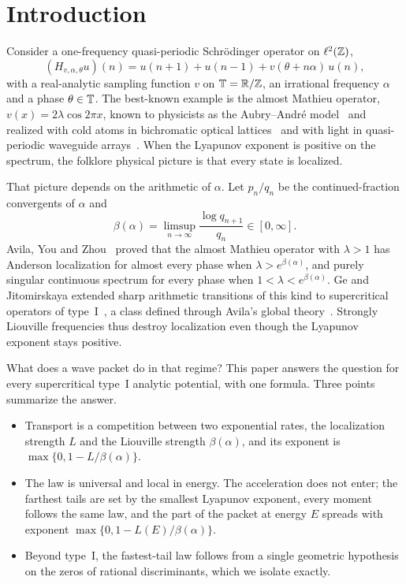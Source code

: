 \section{Introduction}\label{sec:intro}

Consider a one-frequency quasi-periodic Schr\"odinger operator on $\ell^2(\mathbb Z)$,
\begin{equation}\label{eq:qp}
(H_{v,\alpha,\theta}u)(n)=u(n+1)+u(n-1)+v(\theta+n\alpha)\,u(n),
\end{equation}
with a real-analytic sampling function $v$ on $\mathbb T=\mathbb R/\mathbb Z$, an irrational frequency $\alpha$ and a phase $\theta\in\mathbb T$. The best-known example is the almost Mathieu operator, $v(x)=2\lambda\cos2\pi x$, known to physicists as the Aubry--Andr\'e model~\cite{AubryAndre1980} and realized with cold atoms in bichromatic optical lattices~\cite{Roati2008} and with light in quasi-periodic waveguide arrays~\cite{Lahini2009}. When the Lyapunov exponent is positive on the spectrum, the folklore physical picture is that every state is localized.

That picture depends on the arithmetic of $\alpha$. Let $p_n/q_n$ be the continued-fraction convergents of $\alpha$ and
\begin{equation}\label{eq:beta}
\beta(\alpha)=\limsup_{n\to\infty}\frac{\log q_{n+1}}{q_n}\in[0,\infty].
\end{equation}
Avila, You and Zhou~\cite{AYZ2017} proved that the almost Mathieu operator with $\lambda>1$ has Anderson localization for almost every phase when $\lambda>e^{\beta(\alpha)}$, and purely singular continuous spectrum for every phase when $1<\lambda<e^{\beta(\alpha)}$. Ge and Jitomirskaya extended sharp arithmetic transitions of this kind to supercritical operators of type~I~\cite{GeJitomirskaya2024}, a class defined through Avila's global theory~\cite{Avila2015}. Strongly Liouville frequencies thus destroy localization even though the Lyapunov exponent stays positive.

What does a wave packet do in that regime? This paper answers the question for every supercritical type~I analytic potential, with one formula. Three points summarize the answer.
\begin{itemize}
\item Transport is a competition between two exponential rates, the localization strength $L$ and the Liouville strength $\beta(\alpha)$, and its exponent is $\max\{0,1-L/\beta(\alpha)\}$.
\item The law is universal and local in energy. The acceleration does not enter; the farthest tails are set by the smallest Lyapunov exponent, every moment follows the same law, and the part of the packet at energy $E$ spreads with exponent $\max\{0,1-L(E)/\beta(\alpha)\}$.
\item Beyond type~I, the fastest-tail law follows from a single geometric hypothesis on the zeros of rational discriminants, which we isolate exactly.
\end{itemize}

